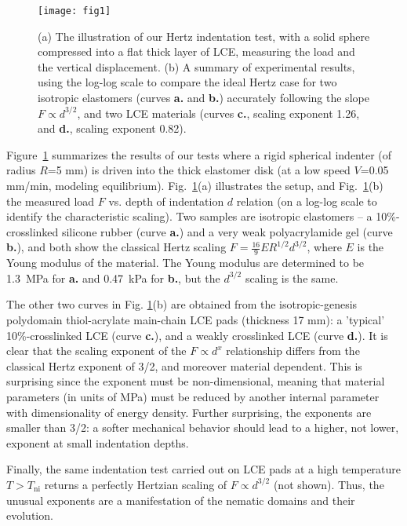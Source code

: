 \documentclass[12pt]{article}
\begin{document}
\begin{figure}
 \centering
\texttt{[image: fig1]}
\caption{(a) The illustration of our Hertz indentation test, with a solid sphere compressed into a flat thick layer of LCE, measuring the load and the vertical displacement. (b) A summary of experimental results, using the log-log scale to compare the ideal Hertz case for two isotropic elastomers (curves \textbf{a.} and \textbf{b.}) accurately following the slope $F \propto d^{3/2}$, and two LCE materials (curves \textbf{c.}, scaling exponent 1.26, and \textbf{d.}, scaling exponent 0.82).} 
\label{fig:Hertz}
\end{figure}

Figure~\ref{fig:Hertz} summarizes the results of our tests where a rigid spherical indenter (of radius $R$=5 mm) is driven into the thick elastomer disk (at a low speed $V$=0.05 mm/min, modeling equilibrium). 
Fig.~\ref{fig:Hertz}(a) illustrates the setup, and  Fig.~\ref{fig:Hertz}(b) the measured load $F$ vs. depth of indentation $d$ relation (on a log-log scale to identify the characteristic scaling). Two samples are isotropic elastomers -- a 10\%-crosslinked silicone rubber (curve \textbf{a.}) and a very weak polyacrylamide gel (curve \textbf{b.}), and both show the classical Hertz scaling \cite{timoshenko,Landau} $F = \frac{16}{9}E R^{1/2} d^{3/2}$, where $E$ is the Young modulus of the material.  The Young modulus are determined to be 1.3~MPa for \textbf{a.} and 0.47~kPa for \textbf{b.}, but the $d^{3/2}$ scaling is the same. 

The other two curves in Fig. \ref{fig:Hertz}(b) are obtained from the isotropic-genesis polydomain thiol-acrylate main-chain LCE pads (thickness 17 mm): a 'typical' 10\%-crosslinked LCE (curve \textbf{c.}), and  a weakly crosslinked LCE (curve \textbf{d.}).  It is clear that the scaling exponent of the $F \propto d^{x}$ relationship differs from the classical Hertz exponent of 3/2, and moreover material dependent. 
This is surprising since the exponent must be non-dimensional, meaning that material parameters (in units of MPa) must be reduced by another internal  parameter with dimensionality of energy density.
Further surprising, the exponents are smaller than 3/2: a softer mechanical behavior should lead to a higher, not lower, exponent at small indentation depths. 

Finally, the same indentation test carried out on LCE pads at a high temperature $T>T_\mathrm{ni}$ returns a perfectly Hertzian scaling of $F \propto d^{3/2}$ (not shown).  Thus, the unusual exponents are a manifestation of the nematic domains and their evolution.
\end{document}
